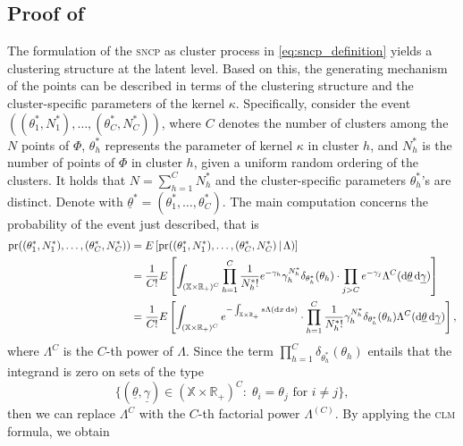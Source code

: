 \documentclass[11pt,a4paper,oneside]{article}
\newcommand{\dd}{\mathrm d}
\newcommand{\E}{E}
\newcommand{\X}{\mathbb{X}}
\newcommand{\R}{\mathbb{R}}
\newcommand{\prob}{{\rm pr}}
\renewcommand{\mid}{\ensuremath{\,|\,}}
\theoremstyle{definition}
\theoremstyle{remark}
\begin{document}
\subsection*{Proof of }

The formulation of the \textsc{sncp} as cluster process in \eqref{eq:sncp_definition} yields a clustering structure at the latent level. Based on this, the generating mechanism of the points can be described in terms of the clustering structure and the cluster-specific parameters of the kernel $\kappa$. Specifically, consider the event $((\theta^*_1,N^*_1),\ldots,(\theta^*_C,N^*_C))$, where $C$ denotes the number of clusters among the $N$ points of $\Phi$, $\theta^*_h$ represents the parameter of kernel $\kappa$ in cluster $h$, and $N^*_h$ is the number of points of $\Phi$ in cluster $h$, given a uniform random ordering of the clusters. It holds that $N= \sum_{h=1}^C N^*_h$ and the cluster-specific parameters $\theta^*_h$'s are distinct. Denote with $\underline{\theta}^* = (\theta^*_1,\ldots,\theta^*_C)$. The main computation concerns the probability of the event just described, that is
\begin{equation*}
\begin{aligned}
    \prob((\theta^*_1,N^*_1),\ldots,(\theta^*_C,N^*_C)) &= \E\left[ \prob((\theta^*_1,N^*_1),\ldots,(\theta^*_C,N^*_C) \mid \Lambda) \right]\\
    &= \frac{1}{C!} \E\left[ \int_{(\X\times\R_+)^C} \prod_{h=1}^C \frac{1}{{N^*_h}!} e^{-\gamma_h}  \gamma_h^{N^*_h} \delta_{\theta^*_h}(\theta_h) \cdot \prod_{j > C} e^{-\gamma_j} \Lambda^C (\dd \underline{\theta} \, \dd \underline{\gamma}) \right]\\
     &= \frac{1}{C!}\E\left[ \int_{(\X\times\R_+)^C}  e^{-\int_{\X\times\R_+} s \Lambda(\dd x\, \dd s)} \cdot \prod_{h=1}^C \frac{1}{{N^*_h}!}  \gamma_h^{N^*_h} \delta_{\theta^*_h}(\theta_h)  \Lambda^C (\dd\underline{\theta}\, \dd \underline{\gamma}) \right],
\end{aligned}
\end{equation*}
where $\Lambda^C$ is the $C$-th power of $\Lambda$.
Since the term $\prod_{h=1}^C \delta_{\theta^*_h}(\theta_h)$ entails that the integrand is zero on sets of the type
\[
    \{(\underline{\theta}, \underline{\gamma}) \in (\X\times\R_+)^C : \; \theta_i = \theta_j \text{ for } i \neq j \},
\]
then we can replace $\Lambda^C$ with the $C$-th factorial power $\Lambda^{(C)}$. By applying the \textsc{clm} formula, we obtain
\end{document}
